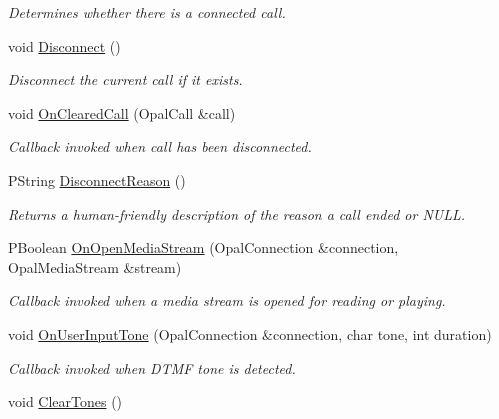 \begin{CompactItemize}
\begin{CompactList}\small\item\em Determines whether there is a connected call. \item\end{CompactList}\item 
void \hyperlink{classTelephonyIfc_68160576582be102ace0f4ae277d7129}{Disconnect} ()
\begin{CompactList}\small\item\em Disconnect the current call if it exists. \item\end{CompactList}\item 
void \hyperlink{classTelephonyIfc_7efa2a51fd26f3c5072ee8b7ba09d75c}{OnClearedCall} (OpalCall \&call)
\begin{CompactList}\small\item\em Callback invoked when call has been disconnected. \item\end{CompactList}\item 
\hypertarget{classTelephonyIfc_d5e6a50893f0915064f23c8d50de481f}{
PString \hyperlink{classTelephonyIfc_d5e6a50893f0915064f23c8d50de481f}{DisconnectReason} ()}
\label{classTelephonyIfc_d5e6a50893f0915064f23c8d50de481f}

\begin{CompactList}\small\item\em Returns a human-friendly description of the reason a call ended or NULL. \item\end{CompactList}\item 
PBoolean \hyperlink{classTelephonyIfc_f3a2ff3766cf45c203dba5a2260445b1}{OnOpenMediaStream} (OpalConnection \&connection, OpalMediaStream \&stream)
\begin{CompactList}\small\item\em Callback invoked when a media stream is opened for reading or playing. \item\end{CompactList}\item 
void \hyperlink{classTelephonyIfc_085ab0d59a990bda8b17cb56b1baaeb1}{OnUserInputTone} (OpalConnection \&connection, char tone, int duration)
\begin{CompactList}\small\item\em Callback invoked when DTMF tone is detected. \item\end{CompactList}\item 
\hypertarget{classTelephonyIfc_c471d58342002859cc9a59b1d1e494ca}{
void \hyperlink{classTelephonyIfc_c471d58342002859cc9a59b1d1e494ca}{ClearTones} ()}
\label{classTelephonyIfc_c471d58342002859cc9a59b1d1e494ca}


\end{CompactItemize}
